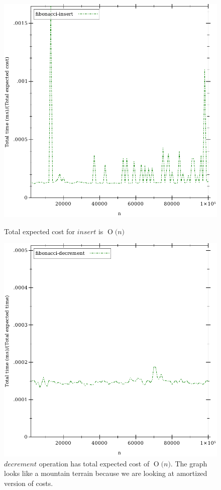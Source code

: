\documentclass{llncs}
\newcommand{\BigO}[1]{\ensuremath{\operatorname{O}\bigl(#1\bigr)}}
\begin{document}
\begin{figure}
	\begin{center}
		\includegraphics[scale=0.7]{FIG/insert.pdf}
		\caption{Total expected cost for $insert$ is \BigO{n}}
		\label{fig:fi_insert}

		\includegraphics[scale=0.7]{FIG/decrement.pdf}
		\caption{$decrement$ operation has total expected cost of \BigO{n}. The graph looks like a mountain terrain because we are looking at amortized version of costs.}
		\label{fig:fi_decrement}

	\end{center}
\end{figure}
\bigskip
\end{document}
